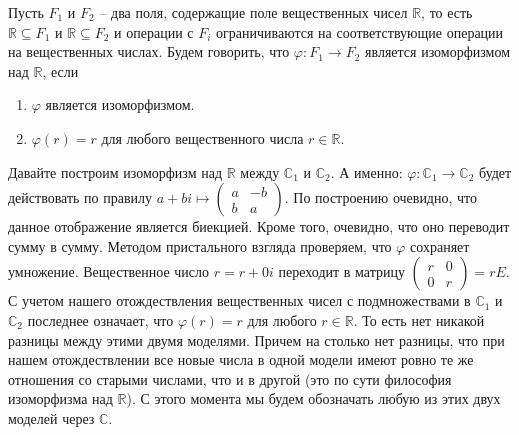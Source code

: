 \begin{definition}
\label{def::FieldsHomOver}
Пусть $F_1$ и $F_2$ -- два поля, содержащие поле вещественных чисел $\mathbb R$, то есть $\mathbb R\subseteq F_1$ и $\mathbb R\subseteq F_2$ и операции с $F_i$ ограничиваются на соответствующие операции на вещественных числах.
Будем говорить, что $\varphi\colon F_1\to F_2$ является изоморфизмом над $\mathbb R$, если 
\begin{enumerate}
\item $\varphi$ является изоморфизмом.

\item $\varphi(r) = r$ для любого вещественного числа $r\in \mathbb R$.
\end{enumerate}
\end{definition}

Давайте построим изоморфизм над $\mathbb R$ между $\mathbb C_1$ и $\mathbb C_2$.
А именно: $\varphi\colon \mathbb C_1\to \mathbb C_2$ будет действовать по правилу $a+bi \mapsto \left(\begin{smallmatrix}{a}&{-b}\\{b}&{a}\end{smallmatrix}\right)$.
По построению очевидно, что данное отображение является биекцией.
Кроме того, очевидно, что оно переводит сумму в сумму.
Методом пристального взгляда проверяем, что $\varphi$ сохраняет умножение.
Вещественное число $r = r + 0i$ переходит в матрицу $\left(\begin{smallmatrix}{r}&{0}\\{0}&{r}\end{smallmatrix}\right) = rE$.
С учетом нашего отождествления вещественных чисел с подмножествами в $\mathbb C_1$ и $\mathbb C_2$ последнее означает, что $\varphi(r) = r$ для любого $r\in\mathbb R$.
То есть нет никакой разницы между этими двумя моделями.
Причем на столько нет разницы, что при нашем отождествлении все новые числа в одной модели имеют ровно те же отношения со старыми числами, что и в другой (это по сути философия изоморфизма над $\mathbb R$).
С этого момента мы будем обозначать любую из этих двух моделей через $\mathbb C$.
